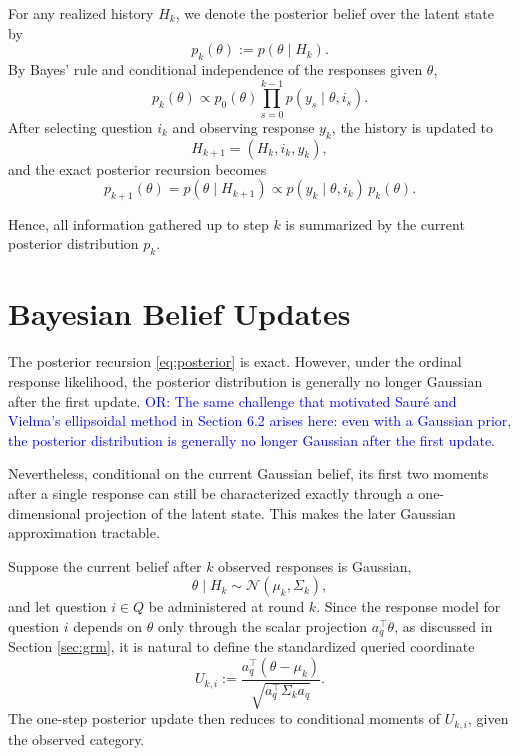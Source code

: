 \documentclass{article}
\begin{document}
For any realized history $H_k$, we denote the posterior belief over the latent state by
\[
p_k(\theta) := p(\theta \mid H_k).
\]
By Bayes' rule and conditional independence of the responses given $\theta$,
\[
p_k(\theta)
\propto
p_0(\theta)\prod_{s=0}^{k-1} p(y_s \mid \theta, i_s).
\]
After selecting question $i_k$ and observing response $y_k$, the history is updated to
\begin{equation*}
H_{k+1}=(H_k,i_k,y_k),
\end{equation*}
and the exact posterior recursion becomes
\begin{equation}\label{eq:posterior}
p_{k+1}(\theta)
=
p(\theta\mid H_{k+1})
\propto
p(y_k\mid \theta,i_k)\,p_k(\theta).
\end{equation}

Hence, all information gathered up to step $k$ is summarized by the current posterior
distribution $p_k$.


\section{Bayesian Belief Updates}\label{sec:bayesian_belief_updates}
The posterior recursion \eqref{eq:posterior} is exact. However, under the ordinal response
likelihood, the posterior distribution is generally no longer Gaussian after the first update.
\textcolor{blue}{OR: The same challenge that motivated Saur\'e and Vielma's ellipsoidal method in Section 6.2 arises here: even with a Gaussian prior, the posterior distribution is generally no longer Gaussian after the first update.}

Nevertheless, conditional on the current Gaussian belief, its first two moments after a single
response can still be characterized exactly through a one-dimensional projection of the latent
state. This makes the later Gaussian approximation tractable.

Suppose the current belief after $k$ observed responses is Gaussian,
\begin{equation*}
\theta \mid H_k \sim \mathcal N(\mu_k,\Sigma_k),
\end{equation*}
and let question $i\in Q$ be administered at round $k$. Since the response model for question $i$
depends on $\theta$ only through the scalar projection $a_q^\top\theta$, as discussed in Section \ref{sec:grm}, it is natural to define the
standardized queried coordinate
\begin{equation*}
U_{k,i}
:=
\frac{a_q^\top(\theta-\mu_k)}{\sqrt{a_q^\top\Sigma_k a_q}}.
\end{equation*}
The one-step posterior update then reduces to conditional moments of $U_{k,i}$, given the
observed category.
\end{document}
